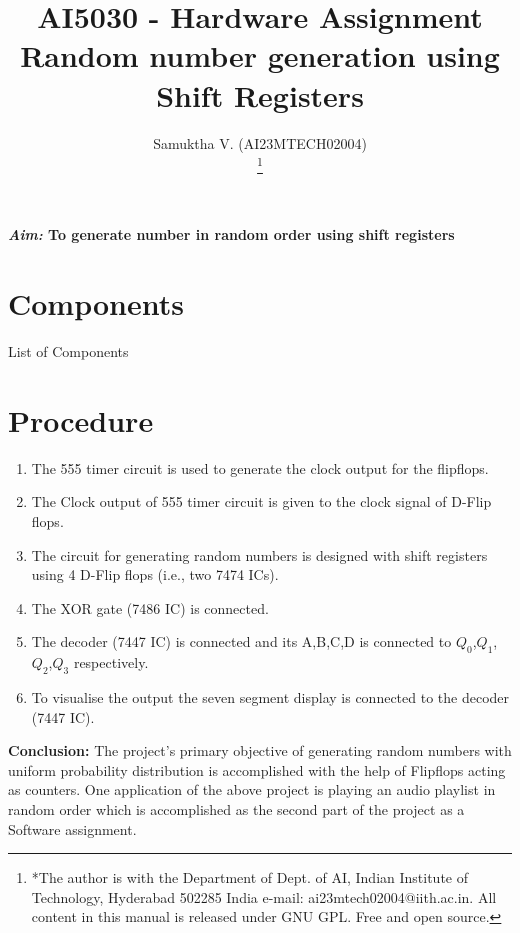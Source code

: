 \documentclass[journal,12pt,twocolumn]{IEEEtran}
\begin{document}
\vspace{3cm}

\title{
AI5030 - Hardware Assignment\\
Random number generation using Shift Registers%
}
\author{ Samuktha V. (AI23MTECH02004)

	\thanks{*The author is with the Department
		of Dept. of AI, Indian Institute of Technology, Hyderabad
		502285 India e-mail:  ai23mtech02004@iith.ac.in. All content in this manual is released under GNU GPL.  Free and open source.}
}

\maketitle

\newpage
\textbf{\emph{Aim:} To generate number in random order using shift registers}
\newline

\section{Components }
\begin{table}[htbp]
	\label{tab:Hardware_Assignment}
	
	\caption{List of Components}
\end{table}



\section{Procedure}
\begin{enumerate}[label=(\roman*)]
	\item The 555 timer circuit is used to generate the clock output for the flipflops.
	\item The Clock output of 555 timer circuit is given to the clock signal of D-Flip flops.
	\item The circuit for generating random numbers is designed with shift registers using  4 D-Flip flops (i.e., two 7474 ICs).
	\item The XOR gate (7486 IC) is connected.
	\item The decoder (7447 IC) is connected and its A,B,C,D is connected to $Q_0$,$Q_1$,$Q_2$,$Q_3$ respectively.
	\item To visualise the output the seven segment display is connected to the decoder (7447 IC).
\end{enumerate}

\textbf{Conclusion:} 
The project's primary objective of generating random numbers with uniform probability distribution is accomplished with the help of Flipflops acting as counters.
One application of the above project is playing an audio playlist in random order which is accomplished as the second part of the project as a Software assignment.
\end{document}
